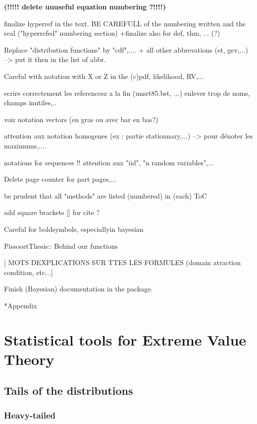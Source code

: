 \documentclass[11pt,a4paper,openany ]{book}
\makeatletter
\renewcommand\part{%
	\if@openright
	\cleardoublepage
	\else
	\clearpage
	\fi
	\thispagestyle{empty}%
	\if@twocolumn
	\onecolumn
	\@tempswatrue
	\else
	\@tempswafalse
	\fi
	\null\vfil
	\secdef\@part\@spart}
\makeatother
\begin{document}
\textbf{(!!!!! delete unuseful equation numbering ?!!!!)}

finalize hyperref in the text. BE CAREFULL of the numbering written and the real ("hyperrefed" numbering section)
+finalize also for def, thm, ... (?)

Replace "distribution functions" by "cdf",....  + all other abbrevations (et, gev,...) --> put it then in the list of abbr.

Careful with notation with X or Z in the (c)pdf, likelihood, RV,...

ecrire correctement les referencesz a la fin (unsrt85.bst, ...) enlever trop de noms, champs inutiles,..

voir notation vectors (en gras ou avec bar en bas?)

attention aux notation homogenes (ex : partie stationnary,...) --> pour dénoter les 
maximums,....

notations for sequences !! attention aux "iid", "n random variables",... 

Delete page counter for part pages,...

be prudent that all "methods" are listed (numbered) in (each) ToC

add square brackets [] for cite ? 

Careful for boldsymbols, especiallyin bayesian

PissoortThesis:: Behind our functions 

[ MOTS DEXPLICATIONS SUR TTES LES FORMULES (domain atraction condition, etc...]

Finish (Bayesian) documentation in the package.

\part*{Appendix}

\appendix

\chapter{Statistical tools for Extreme Value Theory}\label{appA}

\section{Tails of the distributions}\label{app:tails}

\subsection*{Heavy-tailed} 
\end{document}
